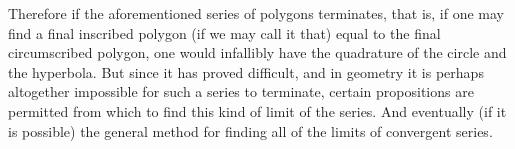 \documentclass[11pt,letterpaper]{book}
\begin{document}
Therefore if the aforementioned series of polygons terminates, that is,
if one may find a final inscribed polygon (if we may call it that) equal to the
final circumscribed polygon, one would infallibly have the quadrature of the
circle and the hyperbola. But since it has proved difficult, and in geometry it
is perhaps altogether impossible for such a series to terminate, certain
propositions are permitted from which to find this kind of limit of the series.
And eventually (if it is possible) the general method for finding all of the
limits of convergent series.

\end{document}
